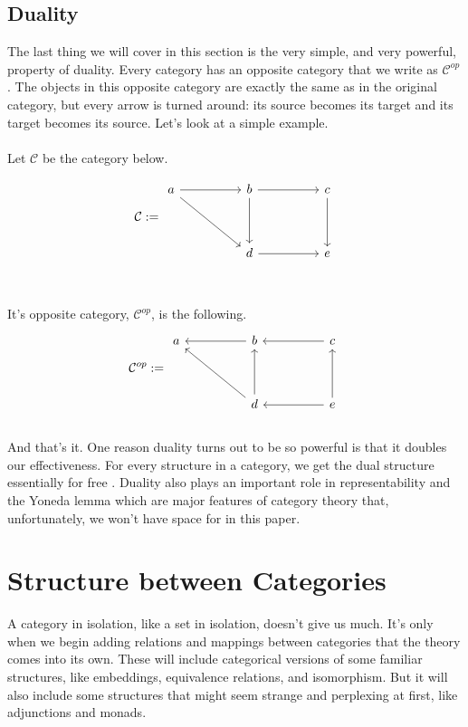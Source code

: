 \documentclass[12pt]{article}
\newcounter{examp}
\begin{document}
\subsection*{Duality}
The last thing we will cover in this section is the very simple, and very powerful, property of duality.
Every category has an opposite category that we write as $\mathcal{C}^{op}$.
The objects in this opposite category are exactly the same as in the original category, but every arrow is turned around: its source becomes its target and its target becomes its source.
Let's look at a simple example.\\\\
Let $\mathcal{C}$ be the category below.

\[\mathcal{C} := \begin{tikzcd}
    a && b && c \\
    \\
    && d && e
    \arrow[from=1-1, to=1-3]
    \arrow[from=1-1, to=3-3]
    \arrow[from=1-3, to=3-3]
    \arrow[from=3-3, to=3-5]
    \arrow[from=1-3, to=1-5]
    \arrow[from=1-5, to=3-5]
  \end{tikzcd}\]
\\\\It's opposite category, $\mathcal{C}^{op}$, is the following.
\[\mathcal{C}^{op} := \begin{tikzcd}
    a && b && c \\
    \\
    && d && e
    \arrow[from=1-3, to=1-1]
    \arrow[from=3-3, to=1-1]
    \arrow[from=3-3, to=1-3]
    \arrow[from=3-5, to=3-3]
    \arrow[from=1-5, to=1-3]
    \arrow[from=3-5, to=1-5]
  \end{tikzcd}\]
\\
And that's it.
One reason duality turns out to be so powerful is that it doubles our effectiveness.
For every structure in a category, we get the dual structure essentially for free \cite{cheng2022joy}.
Duality also plays an important role in representability and the Yoneda lemma which are major features of category theory that, unfortunately, we won't have space for in this paper.








\section*{Structure between Categories}
A category in isolation, like a set in isolation, doesn't give us much.
It's only when we begin adding relations and mappings between categories that the theory comes into its own.
These will include categorical versions of some familiar structures, like embeddings, equivalence relations, and isomorphism.
But it will also include some structures that might seem strange and perplexing at first, like adjunctions and monads.
\end{document}
